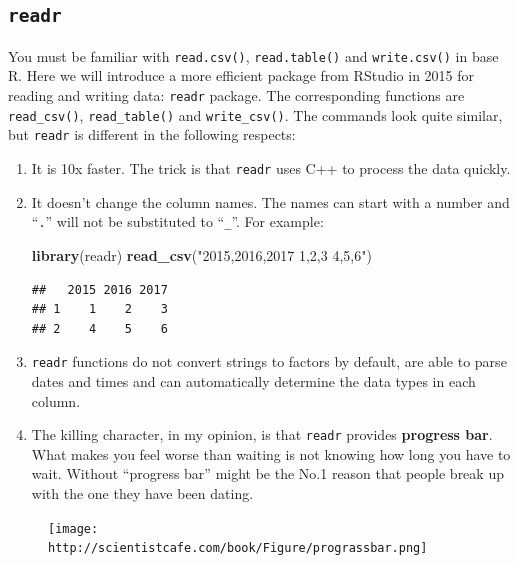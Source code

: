 \documentclass[]{book}
\newenvironment{Shaded}{\begin{snugshade}}{\end{snugshade}}
\newcommand{\KeywordTok}[1]{\textcolor[rgb]{0.13,0.29,0.53}{\textbf{{#1}}}}
\newcommand{\StringTok}[1]{\textcolor[rgb]{0.31,0.60,0.02}{{#1}}}
\newcommand{\NormalTok}[1]{{#1}}
\theoremstyle{definition}
\theoremstyle{definition}
\theoremstyle{remark}
\begin{document}
\subsection{\texorpdfstring{\texttt{readr}}{readr}}\label{readr}

You must be familiar with \texttt{read.csv()}, \texttt{read.table()} and
\texttt{write.csv()} in base R. Here we will introduce a more efficient
package from RStudio in 2015 for reading and writing data:
\texttt{readr} package. The corresponding functions are
\texttt{read\_csv()}, \texttt{read\_table()} and \texttt{write\_csv()}.
The commands look quite similar, but \texttt{readr} is different in the
following respects:

\begin{enumerate}
\def\labelenumi{\arabic{enumi}.}
\item
  It is 10x faster. The trick is that \texttt{readr} uses C++ to process
  the data quickly.
\item
  It doesn't change the column names. The names can start with a number
  and ``\texttt{.}'' will not be substituted to ``\texttt{\_}''. For
  example:

\begin{Shaded}
\begin{Highlighting}[]
\KeywordTok{library}\NormalTok{(readr)}
\KeywordTok{read_csv}\NormalTok{(}\StringTok{"2015,2016,2017}
\StringTok{1,2,3}
\StringTok{4,5,6"}\NormalTok{)}
\end{Highlighting}
\end{Shaded}

\begin{verbatim}
##   2015 2016 2017
## 1    1    2    3
## 2    4    5    6
\end{verbatim}
\item
  \texttt{readr} functions do not convert strings to factors by default,
  are able to parse dates and times and can automatically determine the
  data types in each column.
\item
  The killing character, in my opinion, is that \texttt{readr} provides
  \textbf{progress bar}. What makes you feel worse than waiting is not
  knowing how long you have to wait. Without ``progress bar'' might be
  the No.1 reason that people break up with the one they have been
  dating.
\end{enumerate}

\begin{figure}[htbp]
\centering
\texttt{[image: http://scientistcafe.com/book/Figure/prograssbar.png]}
\caption{}
\end{figure}
\end{document}
